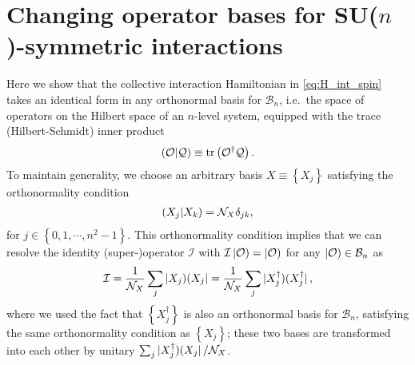 \documentclass[nofootinbib,notitlepage,11pt]{revtex4-2}
\newcommand{\f}[2]{\dfrac{#1}{#2}} %
\newcommand{\p}[1]{\left(#1\right)} %
\renewcommand{\set}[1]{\left\{#1\right\}} %
\newcommand{\1}{\mathds{1}}
\newcommand{\B}{\mathcal{B}}
\newcommand{\I}{\mathcal{I}}
\newcommand{\N}{\mathcal{N}}
\renewcommand{\O}{\mathcal{O}}
\newcommand{\Q}{\mathcal{Q}}
\def\obra#1{\mathinner{({#1}|}}
\def\oket#1{\mathinner{|{#1})}}
\def\obk#1{\mathinner{({#1})}}
\def\oop#1#2{\oket{#1}\!\obra{#2}}
\begin{document}
\section{Changing operator bases for SU($n$)-symmetric interactions}
\label{sec:changing_bases}

Here we show that the collective interaction Hamiltonian in
\eqref{eq:H_int_spin} takes an identical form in any orthonormal basis
for $\B_n$, i.e.~the space of operators on the Hilbert space of an
$n$-level system, equipped with the trace (Hilbert-Schmidt) inner
product
\begin{align}
  \obk{\O|\Q} \equiv \tr\p{\O^\dag \Q}.
\end{align}
To maintain generality, we choose an arbitrary basis
$X\equiv\set{X_j}$ satisfying the orthonormality condition
\begin{align}
  \obk{X_j|X_k} = \N_X \delta_{jk},
\end{align}
for $j\in\set{0,1,\cdots,n^2-1}$.  This orthonormality condition
implies that we can resolve the identity (super-)operator $\I$ with
$\I\oket{\O}=\oket{\O}$ for any $\oket\O\in\B_n$ as
\begin{align}
  \I = \f1{\N_X} \sum_j \oop{X_j}{X_j}
  = \f1{\N_X} \sum_j \oop{X_j^\dag}{X_j^\dag},
\end{align}
where we used the fact that $\set{X_j^\dag}$ is also an orthonormal
basis for $\B_n$, satisfying the same orthonormality condition as
$\set{X_j}$; these two bases are transformed into each other by
unitary $\sum_j\oop{X_j^\dag}{X_j}/\N_X$.
\end{document}
